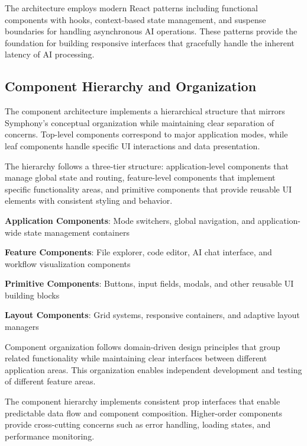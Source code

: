 The architecture employs modern React patterns including functional components with hooks, context-based state management, and suspense boundaries for handling asynchronous AI operations. These patterns provide the foundation for building responsive interfaces that gracefully handle the inherent latency of AI processing.

\subsection*{Component Hierarchy and Organization}

The component architecture implements a hierarchical structure that mirrors Symphony's conceptual organization while maintaining clear separation of concerns. Top-level components correspond to major application modes, while leaf components handle specific UI interactions and data presentation.

The hierarchy follows a three-tier structure: application-level components that manage global state and routing, feature-level components that implement specific functionality areas, and primitive components that provide reusable UI elements with consistent styling and behavior.

\begin{expandedlist}
    \item \textbf{Application Components}: Mode switchers, global navigation, and application-wide state management containers
    \item \textbf{Feature Components}: File explorer, code editor, AI chat interface, and workflow visualization components
    \item \textbf{Primitive Components}: Buttons, input fields, modals, and other reusable UI building blocks
    \item \textbf{Layout Components}: Grid systems, responsive containers, and adaptive layout managers
\end{expandedlist}

Component organization follows domain-driven design principles that group related functionality while maintaining clear interfaces between different application areas. This organization enables independent development and testing of different feature areas.

The component hierarchy implements consistent prop interfaces that enable predictable data flow and component composition. Higher-order components provide cross-cutting concerns such as error handling, loading states, and performance monitoring.


